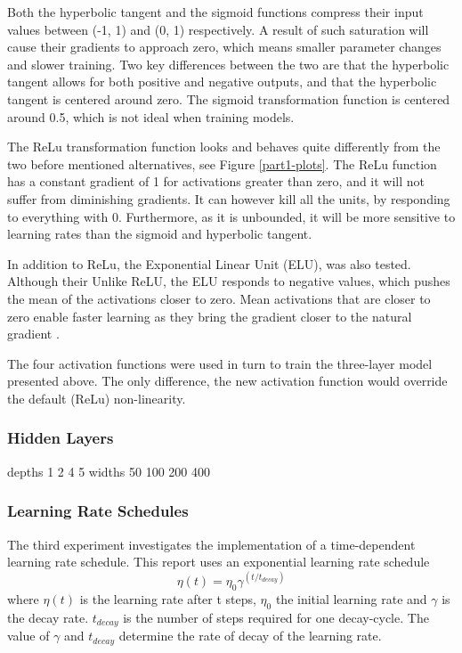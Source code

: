 \documentclass[]{article}
\begin{document}
Both the hyperbolic tangent and the sigmoid functions compress their input values between (-1, 1) and (0, 1) respectively. A result of such saturation will cause their gradients to approach zero, which means smaller parameter changes and slower training. Two key differences between the two are that the hyperbolic tangent allows for both positive and negative outputs, and that the hyperbolic tangent is centered around zero. The sigmoid transformation function is centered around 0.5, which is not ideal when training models.

The ReLu transformation function looks and behaves quite differently from the two before mentioned alternatives, see Figure \ref{part1-plots}. The ReLu function has a constant gradient of 1 for activations greater than zero, and it will not suffer from diminishing gradients. It can however kill all the units, by responding to everything with 0. Furthermore, as it is unbounded, it will be more sensitive to learning rates than the sigmoid and hyperbolic tangent.

In addition to ReLu, the Exponential Linear Unit (ELU), was also tested. Although their   Unlike ReLU, the ELU responds to negative values, which pushes the mean of the activations closer to zero. Mean activations that are closer to zero enable faster learning as they bring the gradient closer to the natural gradient  \cite{elu}.

The four activation functions were used in turn to train the three-layer model presented above. The only difference, the new activation function would override the default (ReLu) non-linearity. 

\subsubsection{Hidden Layers}

depths 1 2 4 5
widths 50 100 200 400


\subsubsection{Learning Rate Schedules}

The third experiment investigates the implementation of a time-dependent learning rate schedule. This report uses an exponential learning rate schedule  
\begin{equation} \label{eq:1}
\eta(t) = \eta_{0} \gamma ^{(t / t_{decay})}
\end{equation}
where \(\eta(t)\) is the learning rate after t steps, \(\eta_{0}\) the initial learning rate and \(\gamma\) is the decay rate. \(t_{decay}\) is the number of steps required for one decay-cycle. The value of \(\gamma\) and \(t_{decay}\) determine the rate of decay of the learning rate. 
\end{document}
